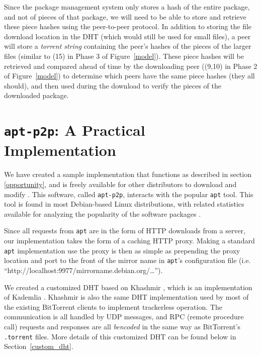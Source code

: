 \documentclass[conference]{IEEEtran}
\begin{document}
Since the package management system only stores a hash of the entire
package, and not of pieces of that package, we will need to be able
to store and retrieve these piece hashes using the peer-to-peer protocol. In
addition to storing the file download location in the DHT (which
would still be used for small files), a peer will store a
\emph{torrent string} containing the peer's hashes of the pieces of
the larger files (similar to (15) in Phase 3 of Figure~\ref{model}).
These piece hashes will be retrieved and compared ahead of time by
the downloading peer ((9,10) in Phase 2 of Figure~\ref{model})
to determine which peers have the same piece hashes (they all
should), and then used during the download to verify the pieces of
the downloaded package.


\section{\texttt{apt-p2p}: A Practical Implementation}
\label{implementation}

We have created a sample implementation that functions as described
in section \ref{opportunity}, and is freely available for other
distributors to download and modify \cite{apt-p2p}. This software,
called \texttt{apt-p2p}, interacts with the popular \texttt{apt} tool. This tool
is found in most Debian-based Linux distributions, with related statistics
available for analyzing the popularity of the software packages
\cite{popcon}.

Since all requests from \texttt{apt} are in the form of HTTP downloads from a
server, our implementation takes the form of a caching HTTP proxy.
Making a standard \texttt{apt} implementation use the proxy is then
as simple as prepending the proxy location and port to the front of
the mirror name in \texttt{apt}'s configuration file (i.e.
``http://localhost:9977/mirrorname.debian.org/\ldots'').

We created a customized DHT based on Khashmir \cite{khashmir}, which
is an implementation of Kademlia \cite{kademlia}. Khashmir is also the same DHT
implementation used by most of the existing BitTorrent clients to
implement trackerless operation. The communication is all handled by
UDP messages, and RPC (remote procedure call) requests and responses
are all \emph{bencoded} in the same way as BitTorrent's
\texttt{.torrent} files.
More details of this customized DHT can be found below in
Section~\ref{custom_dht}.
\end{document}

